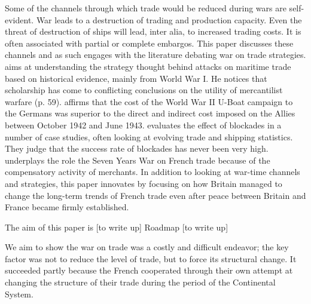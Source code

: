 \documentclass[12pt,a4paper,notitlepage,english]{article}
\begin{document}

Some of the channels through which trade would be reduced during wars are self-evident.
War leads to a destruction of trading and production capacity.
Even the threat of destruction of ships will lead, inter alia, to increased trading costs.
It is often associated with partial or complete embargos.
This paper discusses these channels and as such engages with the literature debating war on trade strategies.
\cite{Tracy1991} aims at understanding the strategy thought behind attacks on maritime trade based on historical evidence, mainly from World War I.
He notices that scholarship has come to conflicting conclusions on the utility of mercantilist warfare (p. 59).
\cite{Pugh1986} affirms that the cost of the World War II U-Boat campaign to the Germans was superior to the direct and indirect cost imposed on the Allies between October 1942 and June 1943.
\cite{Davis2006} evaluates the effect of blockades in a number of case studies, often looking at evolving trade and shipping statistics.
They judge that the success rate of blockades has never been very high.
\cite{Riley1986} underplays the role the Seven Years War on French trade because of the compensatory activity of merchants.
In addition to looking at war-time channels and strategies, this paper innovates by focusing on how Britain managed to change the long-term trends of French trade even after peace between Britain and France became firmly established.

The aim of this paper is [to write up]
Roadmap [to write up]

We aim to show the war on trade was a costly and difficult endeavor; the key factor was not to reduce the level of trade, but to force its structural change.
It succeeded partly because the French cooperated through their own attempt at changing the structure of their trade during the period of the Continental System.
\end{document}
